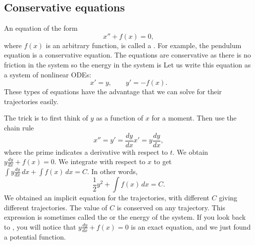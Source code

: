 \subsection{Conservative equations}

An equation of the form
\begin{equation*}
x'' + f(x) = 0,
\end{equation*}
where $f(x)$ is an arbitrary function, is called a
\emph{}.  For example, the pendulum equation
is a conservative equation.  The equations are conservative as there is no
friction in the system so the energy in the system is 
Let us write this equation as a
system of nonlinear ODEs:
\begin{equation*}
x' = y, \qquad y' = -f(x) .
\end{equation*}
These types of equations have the
advantage that we can solve for their trajectories easily.

The trick is to first think of $y$ as a function of $x$ for a moment.  Then
use the chain rule
\begin{equation*}
x'' = y' = \frac{dy}{dx} x' = y \frac{dy}{dx} ,
\end{equation*}
where the prime indicates a derivative with respect to $t$.  
We obtain $y \frac{dy}{dx} + f(x) = 0$.  We integrate with respect to
$x$ to get
$\int y \frac{dy}{dx} \,dx + \int f(x)\, dx = C$.  In other words,
\begin{equation*}
\frac{1}{2} y^2  + \int f(x)\, dx = C .
\end{equation*}
We obtained an implicit equation for the trajectories, with different $C$
giving different trajectories.  The value of
$C$ is conserved on any trajectory.  This expression is
sometimes called the \emph{} or the energy of the
system.
If you look back to , you will notice
that $y\frac{dy}{dx} + f(x) = 0$ is an exact equation, and
we just found a potential function.

